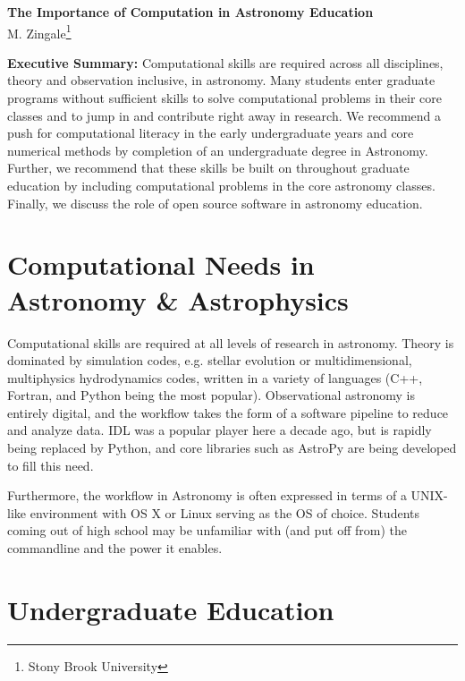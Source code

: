 \documentclass[11pt]{article}
\begin{document}
\thispagestyle{plain}

\begin{center}
{\Large \sffamily \bfseries The Importance of Computation in Astronomy Education} \\
{M. Zingale\footnote{Stony Brook University}}
\end{center}

\begin{tcolorbox}
{\sffamily \bfseries Executive Summary:} Computational skills are required
across all disciplines, theory and observation inclusive, in astronomy.
Many students enter graduate programs without sufficient skills
to solve computational problems in their core classes and to jump in and
contribute right away in research.  We recommend a push for computational
literacy in the early undergraduate years and core numerical methods by
completion of an undergraduate degree in Astronomy.  Further, we recommend
that these skills be built on throughout graduate education by including
computational problems in the core astronomy classes.  Finally, we discuss
the role of open source software in astronomy education.
\end{tcolorbox}

\section{Computational Needs in Astronomy \& Astrophysics}

Computational skills are required at all levels of research in
astronomy.  Theory is dominated by simulation codes, e.g. stellar
evolution or multidimensional, multiphysics hydrodynamics codes,
written in a variety of languages (C++, Fortran, and Python being the
most popular).  Observational astronomy is entirely digital, and the
workflow takes the form of a software pipeline to reduce and analyze
data.  IDL was a popular player here a decade ago, but is rapidly
being replaced by Python, and core libraries such as AstroPy are being
developed to fill this need.

Furthermore, the workflow in Astronomy is often expressed in terms of
a UNIX-like environment with OS X or Linux serving as the OS of
choice.  Students coming out of high school may be unfamiliar with
(and put off from) the commandline and the power it enables.

\section{Undergraduate Education}
\end{document}
